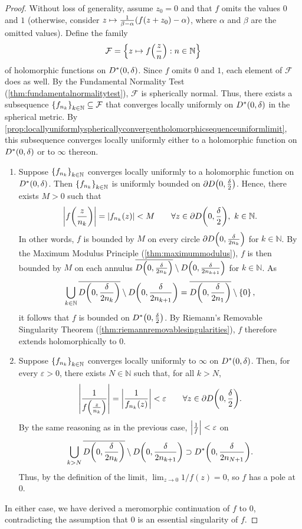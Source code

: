 \begin{proof}
    Without loss of generality, assume \(z_0=0\) and that \(f\) omits the values \(0\) and \(1\) (otherwise, consider \(z\mapsto\frac1{\beta-\alpha}(f\qty(z+z_0)-\alpha)\), where \(\alpha\) and \(\beta\) are the omitted values). Define the family
    \[\mathcal{F}=\cbraces{z\mapsto f\qty(\frac zn)}{n\in\mathbb{N}}\]
    of holomorphic functions on \(D^*\qty(0,\delta)\). Since \(f\) omits \(0\) and \(1\), each element of \(\mathcal{F}\) does as well. By the Fundamental Normality Test (\cref{thm:fundamentalnormalitytest}), \(\mathcal{F}\) is spherically normal. Thus, there exists a subsequence \(\cbraces{f_{n_k}}_{k\in\mathbb{N}}\subseteq\mathcal{F}\) that converges locally uniformly on \(D^*\qty(0,\delta)\) in the spherical metric. By \cref{prop:locallyuniformlysphericallyconvergentholomorphicsequenceuniformlimit}, this subsequence converges locally uniformly either to a holomorphic function on \(D^*\qty(0,\delta)\) or to \(\infty\) thereon.
    \begin{enumerate}
        \item Suppose \(\cbraces{f_{n_k}}_{k\in\mathbb{N}}\) converges locally uniformly to a holomorphic function on \(D^*\qty(0,\delta)\). Then \(\cbraces{f_{n_k}}_{k\in\mathbb{N}}\) is uniformly bounded on \(\partial D\qty(0,\frac\delta2)\). Hence, there exists \(M>0\) such that
              \[\abs{f\qty(\frac z{n_k})}=\abs{f_{n_k}(z)}<M\qquad\forall z\in\partial D\qty(0,\frac\delta2),\ k\in\mathbb{N}.\]
              In other words, \(f\) is bounded by \(M\) on every circle \(\partial D\qty(0,\frac{\delta}{2n_k})\) for \(k\in\mathbb{N}\). By the Maximum Modulus Principle (\cref{thm:maximummodulus}), \(f\) is then bounded by \(M\) on each annulus \(\overline{D\qty(0,\frac{\delta}{2n_k})}\setminus D\qty(0,\frac{\delta}{2n_{k+1}})\) for \(k\in\mathbb{N}\). As
              \[\bigcup_{k\in\mathbb{N}}\overline{D\qty(0,\frac{\delta}{2n_k})}\setminus D\qty(0,\frac{\delta}{2n_{k+1}})=\overline{D\qty(0,\frac\delta{2n_1})}\setminus\cbraces{0},\]
              it follows that \(f\) is bounded on \(D^*\qty(0,\frac\delta2)\). By Riemann's Removable Singularity Theorem (\cref{thm:riemannremovablesingularities}), \(f\) therefore extends holomorphically to \(0\).

        \item Suppose \(\cbraces{f_{n_k}}_{k\in\mathbb{N}}\) converges locally uniformly to \(\infty\) on \(D^*\qty(0,\delta)\). Then, for every \(\varepsilon>0\), there exists \(N\in\mathbb{N}\) such that, for all \(k>N\),
              \[\abs{\frac{1}{f\qty(\frac{z}{n_k})}}=\abs{\frac1{f_{n_k}(z)}}<\varepsilon\qquad\forall z\in\partial D\qty(0,\frac\delta2).\]
              By the same reasoning as in the previous case, \(\abs{\frac1f}<\varepsilon\) on
              \[\bigcup_{k>N}\overline{D\qty(0,\frac{\delta}{2n_k})}\setminus D\qty(0,\frac{\delta}{2n_{k+1}})\supset D^*\qty(0,\frac{\delta}{2n_{N+1}}).\]
              Thus, by the definition of the limit, \(\lim_{z\to 0}1/f(z)=0\), so \(f\) has a pole at \(0\).
    \end{enumerate}
    In either case, we have derived a meromorphic continuation of \(f\) to \(0\), contradicting the assumption that \(0\) is an essential singularity of \(f\).
\end{proof}
